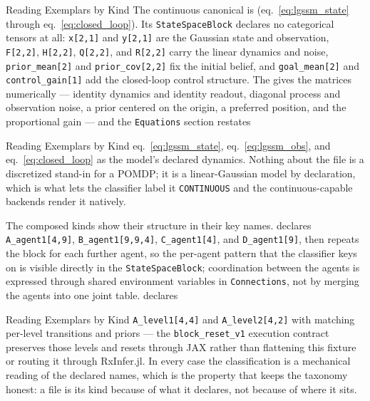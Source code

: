 \documentclass[
  ignorenonframetext,
]{beamer}
\begin{document}
\begin{frame}{Reading Exemplars by Kind}
The continuous canonical is
(eq.~\ref{eq:lgssm_state} through eq.~\ref{eq:closed_loop}). Its
\texttt{StateSpaceBlock} declares no categorical tensors at all:
\texttt{x{[}2,1{]}} and \texttt{y{[}2,1{]}} are the Gaussian state and
observation, \texttt{F{[}2,2{]}}, \texttt{H{[}2,2{]}},
\texttt{Q{[}2,2{]}}, and \texttt{R{[}2,2{]}} carry the linear dynamics
and noise, \texttt{prior\_mean{[}2{]}} and \texttt{prior\_cov{[}2,2{]}}
fix the initial belief, and \texttt{goal\_mean{[}2{]}} and
\texttt{control\_gain{[}1{]}} add the closed-loop control structure. The
 gives the matrices numerically ---
identity dynamics and identity readout, diagonal process and observation
noise, a prior centered on the origin, a preferred position, and the
proportional gain --- and the \texttt{Equations} section restates
\end{frame}

\begin{frame}{Reading Exemplars by Kind}
eq.~\ref{eq:lgssm_state}, eq.~\ref{eq:lgssm_obs}, and
eq.~\ref{eq:closed_loop} as the model's declared dynamics. Nothing about
the file is a discretized stand-in for a POMDP; it is a linear-Gaussian
model by declaration, which is what lets the classifier label it
\texttt{CONTINUOUS} and the continuous-capable backends render it
natively.

The composed kinds show their structure in their key names.
 declares
\texttt{A\_agent1{[}4,9{]}}, \texttt{B\_agent1{[}9,9,4{]}},
\texttt{C\_agent1{[}4{]}}, and \texttt{D\_agent1{[}9{]}}, then repeats
the block for each further agent, so the per-agent pattern that the
classifier keys on is visible directly in the \texttt{StateSpaceBlock};
coordination between the agents is expressed through shared environment
variables in \texttt{Connections}, not by merging the agents into one
joint table.
 declares
\end{frame}

\begin{frame}{Reading Exemplars by Kind}
\texttt{A\_level1{[}4,4{]}} and \texttt{A\_level2{[}4,2{]}} with
matching per-level transitions and priors --- the
\texttt{block\_reset\_v1} execution contract preserves those levels and
resets through JAX rather than flattening this fixture or routing it
through RxInfer.jl. In every case the classification is a mechanical
reading of the declared names, which is the property that keeps the
taxonomy honest: a file is its kind because of what it declares, not
because of where it sits.
\end{frame}
\end{document}

